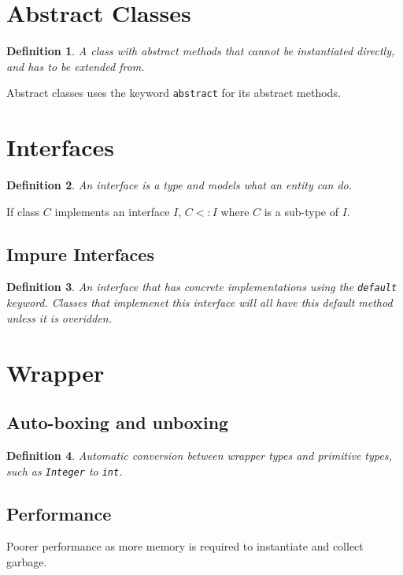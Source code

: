 \documentclass[10pt,landscape,a4paper]{article}
\newtheorem{definition}{Definition}[section]
\begin{document}
\begin{multicols*}{4}
\section{Abstract Classes}
\begin{definition}
    A class with abstract methods that cannot be instantiated directly, and has to be extended from.
\end{definition}
Abstract classes uses the keyword \texttt{abstract} for its abstract methods.

\section{Interfaces}
\begin{definition}
    An interface is a type and models what an entity can do.
\end{definition}
If class $C$ implements an interface $I$, $C<:I$ where $C$ is a sub-type of $I$.

\subsection{Impure Interfaces}
\begin{definition}
    An interface that has concrete implementations using the \texttt{default} keyword. Classes that implemenet this interface will all have this default method unless it is overidden.
\end{definition}


\section{Wrapper}
\subsection{Auto-boxing and unboxing}
\begin{definition}
    Automatic conversion between wrapper types and primitive types, such as \texttt{Integer} to \texttt{int}.
\end{definition}

\subsection{Performance}
Poorer performance as more memory is required to instantiate and collect garbage.



\end{multicols*}
\end{document}
